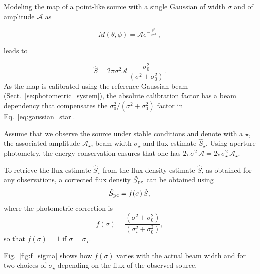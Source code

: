 Modeling the map of a point-like source with a single Gaussian of
width $\sigma$ and of amplitude $\mathcal{A}$ as

\begin{equation}
  M(\theta, \phi) = \mathcal{A} e^{-\frac{\theta^{2}}{2\sigma^2}}\,,
  \label{eq:pointsource_map}
\end{equation}

leads to

\begin{equation}
  \hat{S}  = 2\pi \sigma^2 \mathcal{A} \,  \frac{\sigma_0^2}{(\sigma^2 + \sigma_0^2)}.
  \label{eq:gaussian_star}
\end{equation}
As the map is calibrated using the reference Gaussian beam
(Sect.~\ref{se:photometric_system}), the absolute calibration factor %
has a beam dependency that compensates the
$\sigma_0^2/(\sigma^2 + \sigma_0^2)$ factor in Eq.~\ref{eq:gaussian_star}.

Assume that we observe the source under stable conditions and
denote with a $\star$, the associated amplitude $\mathcal{A}_\star$, beam width
$\sigma_\star$ and flux estimate $\hat{S}_\star$. Using aperture
photometry, the energy conservation ensures that one has
$2\pi\sigma^2 \, \mathcal{A} = 2\pi\sigma_\star^2 \, \mathcal{A_\star}$.

To retrieve the flux estimate $\hat{S}_\star$ from the flux density
estimate $\hat{S}$, as obtained for any observations, a
corrected flux density $\hat{S}_{\rm{pc}}$ can be obtained using 
\begin{equation}
  \hat{S}_{\rm{pc}} = f(\sigma) \, \hat{S},
\end{equation} 
where the photometric correction is 
\begin{equation}
  f(\sigma) = \frac{(\sigma^2 + \sigma_0^2)}{(\sigma_\star^2+\sigma_0^2)}, 
\end{equation} 
so that $f(\sigma) = 1$ if $\sigma=\sigma_\star$.

%

Fig.~\ref{fig:f_sigma} shows how $f(\sigma)$ varies with the actual beam width
and for two choices of $\sigma_\star$ depending on the flux of the observed source.

